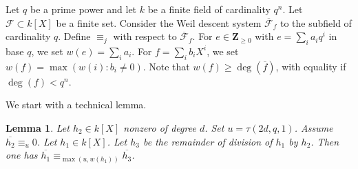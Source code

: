 \documentclass{amsart}
\theoremstyle{plain}
\newtheorem{lemma}[theorem]{Lemma}
\theoremstyle{definition}
\begin{document}
Let $q$ be a prime power and let $k$ be a finite field of cardinality $q^n$. Let $\mathcal{F} \subset k[X]$ be a finite set. Consider the Weil descent system $\overline{\mathcal{F}}_f$ to the subfield of cardinality $q$. Define $\equiv_j$ with respect to $\overline{\mathcal{F}}_f$.
For $e \in {\mathbf{Z}}_{\geq 0}$ with $e= \sum_{i} a_i q^i$ in base $q$, we set $w(e)=\sum_i a_i$. For $f=\sum_i b_i X^i$, we set $w(f) = \max(w(i): b_i \neq 0)$. Note that $w(f) \geq \deg(\overline{f})$, with equality if $\deg(f)<q^n$.

We start with a technical lemma.

\begin{lemma} \label{540}
 Let $h_2 \in k[X]$ nonzero of degree $d$. Set $u=\tau(2d,q,1)$. Assume $\overline{h_2} \equiv_{u} 0$.  Let $h_1 \in k[X]$.
Let $h_3$ be the remainder of division of $h_1$ by $h_2$. Then one has $\overline{h_1}  \equiv_{\max(u,w(h_1))} \overline{h_3}$.
\end{lemma}
\end{document}
